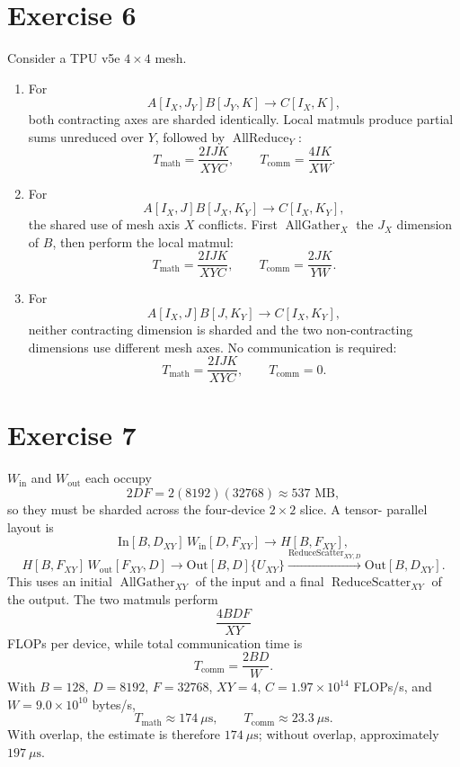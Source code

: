 \documentclass[11pt]{article}
\newcommand{\AG}{\operatorname{AllGather}}
\newcommand{\AR}{\operatorname{AllReduce}}
\newcommand{\RS}{\operatorname{ReduceScatter}}
\begin{document}
\section*{Exercise 6}

Consider a TPU v5e $4\times4$ mesh.

\begin{enumerate}[label=(\alph*)]
\item For
\[
A[I_X,J_Y]B[J_Y,K]\to C[I_X,K],
\]
both contracting axes are sharded identically. Local matmuls produce partial
sums unreduced over $Y$, followed by $\AR_Y$:
\[
T_{\mathrm{math}}=\frac{2IJK}{XYC},
\qquad
T_{\mathrm{comm}}=\frac{4IK}{XW}.
\]

\item For
\[
A[I_X,J]B[J_X,K_Y]\to C[I_X,K_Y],
\]
the shared use of mesh axis $X$ conflicts. First $\AG_X$ the $J_X$ dimension
of $B$, then perform the local matmul:
\[
T_{\mathrm{math}}=\frac{2IJK}{XYC},
\qquad
T_{\mathrm{comm}}=\frac{2JK}{YW}.
\]

\item For
\[
A[I_X,J]B[J,K_Y]\to C[I_X,K_Y],
\]
neither contracting dimension is sharded and the two non-contracting
dimensions use different mesh axes. No communication is required:
\[
T_{\mathrm{math}}=\frac{2IJK}{XYC},
\qquad T_{\mathrm{comm}}=0.
\]
\end{enumerate}

\section*{Exercise 7}

$W_{\mathrm{in}}$ and $W_{\mathrm{out}}$ each occupy
\[
2DF=2(8192)(32768)\approx537\text{ MB},
\]
so they must be sharded across the four-device $2\times2$ slice. A tensor-
parallel layout is
\[
\mathrm{In}[B,D_{XY}]\,W_{\mathrm{in}}[D,F_{XY}]
\to H[B,F_{XY}],
\]
\[
H[B,F_{XY}]\,W_{\mathrm{out}}[F_{XY},D]
\to \mathrm{Out}[B,D]\{U_{XY}\}
\xrightarrow{\RS_{XY,D}}\mathrm{Out}[B,D_{XY}].
\]
This uses an initial $\AG_{XY}$ of the input and a final $\RS_{XY}$ of the
output. The two matmuls perform
\[
\frac{4BDF}{XY}
\]
FLOPs per device, while total communication time is
\[
T_{\mathrm{comm}}=\frac{2BD}{W}.
\]
With $B=128$, $D=8192$, $F=32768$, $XY=4$,
$C=1.97\times10^{14}$ FLOPs/s, and $W=9.0\times10^{10}$ bytes/s,
\[
T_{\mathrm{math}}\approx174\ \mu\mathrm{s},
\qquad
T_{\mathrm{comm}}\approx23.3\ \mu\mathrm{s}.
\]
With overlap, the estimate is therefore $\boxed{174\ \mu\mathrm{s}}$; without
overlap, approximately $197\ \mu\mathrm{s}$.
\end{document}
